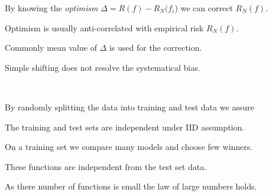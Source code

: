 \documentclass[landscape,footrule]{foils}
\begin{document}

\vspace*{0.5cm}
By knowing the \emph{optimism} $\Delta=R(f)-R_N(f_i$) we can correct $R_N(f)$.   
\begin{triangles}
\item Optimism is usually anti-correlated with empirical risk $R_N(f)$.   
\item Commonly mean value of $\Delta$ is used for the correction. 
\item Simple shifting does not resolve the systematical bias.  
\end{triangles}



\

By randomly splitting the data into training and test data we assure
\begin{triangles}
\item The training and test sets are independent under IID assumption.
\item On a training set we compare many models and  choose few winners. 
\item These functions are independent from the test set data.
\item As there number of functions is small the law of large numbers holds. 
\end{triangles}


\end{document}

